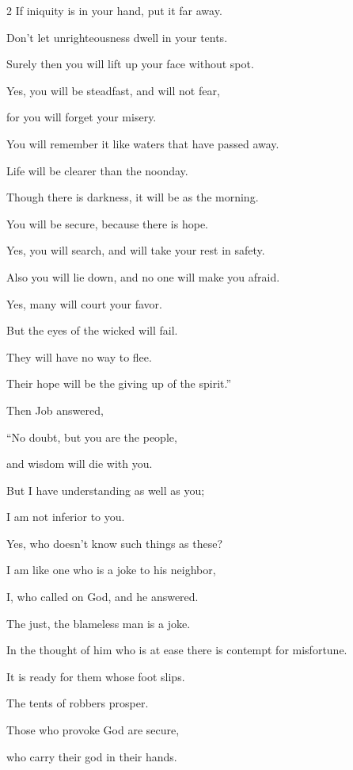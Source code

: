 \begin{multicols}{2}
	\myverse{}If iniquity is in your hand, put it far away.
	
	Don’t let unrighteousness dwell in your tents.
	
	\myverse{}Surely then you will lift up your face without spot.
	
	Yes, you will be steadfast, and will not fear,
	
	\myverse{}for you will forget your misery.
	
	You will remember it like waters that have passed away.
	
	\myverse{}Life will be clearer than the noonday.
	
	Though there is darkness, it will be as the morning.
	
	\myverse{}You will be secure, because there is hope.
	
	Yes, you will search, and will take your rest in safety.
	
	\myverse{}Also you will lie down, and no one will make you afraid.
	
	Yes, many will court your favor.
	
	\myverse{}But the eyes of the wicked will fail.
	
	They will have no way to flee.
	
	Their hope will be the giving up of the spirit.”
	
	
	\mychapter{} \myverse*{}Then Job answered,
	
	\quad\quad \myverse{}“No doubt, but you are the people,
	
	and wisdom will die with you.
	
	\myverse{}But I have understanding as well as you;
	
	I am not inferior to you.
	
	Yes, who doesn’t know such things as these?
	
	\myverse{}I am like one who is a joke to his neighbor,
	
	I, who called on God, and he answered.
	
	The just, the blameless man is a joke.
	
	\myverse{}In the thought of him who is at ease there is contempt for misfortune.
	
	It is ready for them whose foot slips.
	
	\myverse{}The tents of robbers prosper.
	
	Those who provoke God are secure,
	
	who carry their god in their hands.
	

\end{multicols}
